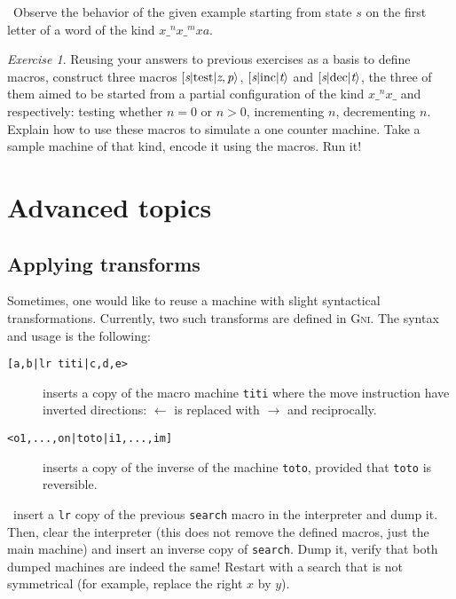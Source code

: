 \documentclass[a4paper,11pt]{article}
\theoremstyle{remark}
\newtheorem{exercise}{Exercise}
\newcommand\doit[1]{\medskip\par\noindent\ding{229}~\textsf{#1}}
\begin{document}
\vspace{-3ex}
\doit{Observe the behavior of the given example starting from state $s$ on the first letter of a word
of the kind $x{\_}^nx{\_}^mxa$.}

\begin{exercise}\label{ex:cm}
Reusing your answers to previous exercises as a basis to define macros, construct three macros
$\left[\mbox{\em s} \middle| \mbox{\rm test} \middle| \mbox{\em z}, \mbox{\em p}\right>$,
$\left[\mbox{\em s} \middle| \mbox{\rm inc} \middle| \mbox{\em t}\right>$
and
$\left[\mbox{\em s} \middle| \mbox{\rm dec} \middle| \mbox{\em t}\right>$,
the three of them aimed to be started from a partial configuration of the kind $x{\_}^nx\_$ and
respectively: testing whether $n=0$ or $n>0$, incrementing $n$, decrementing $n$. 
Explain how to use these
macros to simulate a one counter machine. Take a sample machine of that kind, encode it using
the macros. Run it!
\end{exercise}

\section{Advanced topics}

\subsection{Applying transforms}

Sometimes, one would like to reuse a machine with slight syntactical transformations. Currently,
two such transforms are defined in \textsc{Gni}. The syntax and usage is the following:
\begin{description}
	\item[\texttt{[a,b|lr titi|c,d,e>}] inserts a copy of the macro machine \texttt{titi}
	where the move instruction have inverted directions: $\leftarrow$ is replaced with
	$\rightarrow$ and reciprocally.
	\item[\texttt{<o1,...,on|toto|i1,...,im]}] inserts a copy of the inverse of the machine
	\texttt{toto}, provided that \texttt{toto} is reversible.
\end{description}

\doit{insert a \texttt{lr} copy of the previous \texttt{search} macro in the interpreter and dump it.
Then, clear the interpreter (this does not remove the defined macros, just the main machine) and
insert an inverse copy of \texttt{search}. Dump it, verify that both dumped machines are indeed
the same! Restart with a search that is not symmetrical (for example, replace the right $x$ by $y$).}
\end{document}
